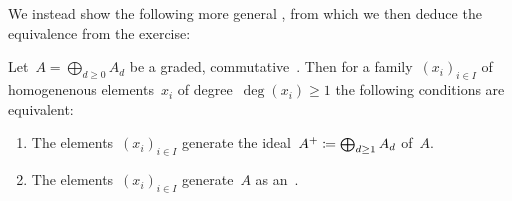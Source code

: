 \section{}

We instead show the following more general , from which we then deduce the equivalence from the exercise:

\begin{lemma}
  \label{bourbaki}
  Let~$A = \bigoplus_{d \geq 0} A_d$ be a graded, commutative~{\kalg}.
  Then for a family~$(x_i)_{i \in I}$ of homogenenous elements~$x_i$ of degree~$\deg(x_i) \geq 1$ the following conditions are equivalent:
  \begin{enumerate}
    \item
      \label{ideal}
      The elements~$(x_i)_{i \in I}$ generate the ideal~$A^+ \coloneqq \bigoplus_{d \geq 1} A_d$ of~$A$.
    \item
      \label{algebra}
      The elements~$(x_i)_{i \in I}$ generate~$A$ as an~.
  \end{enumerate}
\end{lemma}

